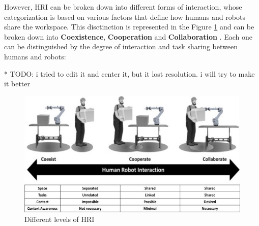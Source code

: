 However, \ac{HRI} can be broken down into different forms of interaction, whose categorization is based on various factors that define how 
humans and robots share the workspace. This disctinction is represented in the Figure \ref{fig:collab} and can be broken down into \textbf{Coexistence}, \textbf{Cooperation} and \textbf{Collaboration} \cite{Jahanmahin2022}. 
Each one can be distinguished by the degree of interaction and task sharing between humans and robots:

* TODO: i tried to edit it and center it, but it lost resolution. i will try to make it better
\begin{figure}[!htbp]
    \includegraphics[width=\linewidth]{figs/table-figure-together.jpeg}
    \caption{Different levels of \ac{HRI}~\cite{Jahanmahin2022}} 
    \label{fig:collab}
\end{figure} 


